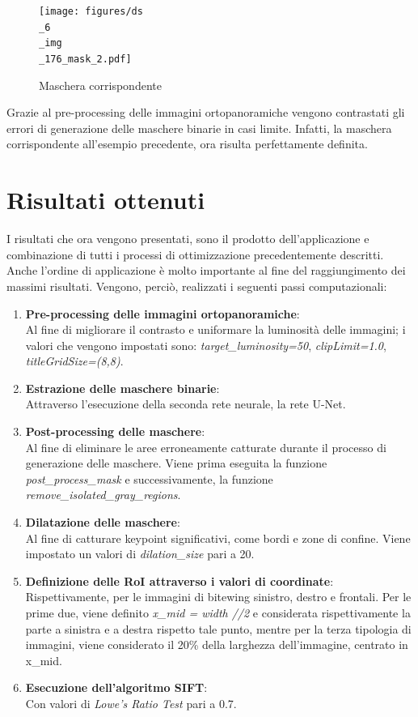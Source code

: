 \documentclass[12pt,a4paper,openright,twoside]{book}
\begin{document}
\begin{figure}[H]
	\centering
	\texttt{[image: figures/ds\\\_6\\\_img\\\_176\_mask\_2.pdf]}
    	\caption{Maschera corrispondente}
	\label{fig:maskLuminosa}
\end{figure}
Grazie al pre-processing delle immagini ortopanoramiche vengono contrastati gli errori di generazione delle maschere binarie in casi limite.
Infatti, la maschera corrispondente all'esempio precedente, ora risulta perfettamente definita.

\section{Risultati ottenuti}
I risultati che ora vengono presentati, sono il prodotto dell'applicazione e combinazione di tutti i processi di ottimizzazione precedentemente descritti. Anche l'ordine di applicazione è molto importante al fine del raggiungimento dei massimi risultati. Vengono, perciò, realizzati i seguenti passi computazionali:
\begin{enumerate}
\item \textbf{Pre-processing delle immagini ortopanoramiche}:\\
Al fine di migliorare il contrasto e uniformare la luminosità delle immagini; i valori che vengono impostati sono: {\itshape target\_luminosity=50}, {\itshape clipLimit=1.0}, {\itshape titleGridSize=(8,8)}.
\item \textbf{Estrazione delle maschere binarie}: \\
Attraverso l'esecuzione della seconda rete neurale, la rete U-Net.
\item \textbf{Post-processing delle maschere}: \\
Al fine di eliminare le aree erroneamente catturate durante il processo di generazione delle maschere. Viene prima eseguita la funzione {\itshape post\_process\_mask} e successivamente, la funzione {\itshape remove\_isolated\_gray\_regions}.
\item \textbf{Dilatazione delle maschere}: \\
Al fine di catturare keypoint significativi, come bordi e zone di confine. Viene impostato un valori di {\itshape dilation\_size} pari a 20.
\item \textbf{Definizione delle RoI attraverso i valori di coordinate}: \\
Rispettivamente, per le immagini di bitewing sinistro, destro e frontali. Per le prime due, viene definito {\itshape x\_mid = width //2} e considerata rispettivamente la parte a sinistra e a destra rispetto tale punto, mentre per la terza tipologia di immagini, viene considerato il 20\% della larghezza dell'immagine, centrato in x\_mid.
\item \textbf{Esecuzione dell'algoritmo SIFT}:\\
Con valori di {\itshape Lowe's Ratio Test} pari a 0.7.
\end{enumerate}
\end{document}

